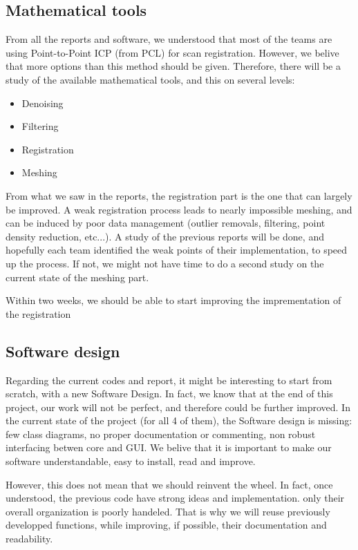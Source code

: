 \documentclass[aps,letterpaper,11pt]{revtex4}
\begin{document}
\subsection{Mathematical tools}

From all the reports and software, we understood that most of the teams are using Point-to-Point ICP (from PCL) for scan registration. However, we belive that more options than this method should be given. Therefore, there will be a study of the available mathematical tools, and this on several levels:

\begin{itemize}
\item Denoising
\item Filtering
\item Registration
\item Meshing
\end{itemize}

From what we saw in the reports, the registration part is the one that can largely be improved. A weak registration process leads to nearly impossible meshing, and can be induced by poor data management (outlier removals, filtering, point density reduction, etc...). A study of the previous reports will be done, and hopefully each team identified the weak points of their implementation, to speed up the process. If not, we might not have time to do a second study on the current state of the meshing part.

Within two weeks, we should be able to start improving the imprementation of the registration 


\subsection{Software design}

Regarding the current codes and report, it might be interesting to start from scratch, with a new Software Design. In fact, we know that at the end of this project, our work will not be perfect, and therefore could be further improved. In  the current state of the project (for all 4 of them), the Software design is missing: few class diagrams, no proper documentation or commenting, non robust interfacing betwen core and GUI. We belive that it is important to make our software understandable, easy to install, read and improve.

However, this does not mean that we should reinvent the wheel. In fact, once understood, the previous code have strong ideas and implementation. only their overall organization is poorly handeled. That is why we will reuse previously developped functions, while improving, if possible, their documentation and readability.
\end{document}
